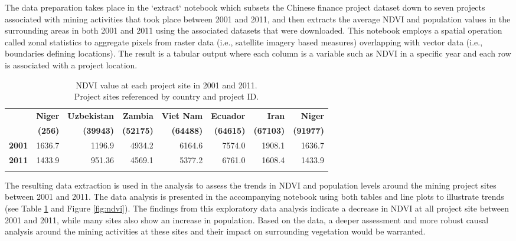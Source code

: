 \documentclass[a4paper]{article}
\begin{document}
The data preparation takes place in the `extract` notebook which subsets the Chinese finance project dataset down to seven projects associated with mining activities that took place between 2001 and 2011, and then extracts the average NDVI and population values in the surrounding areas in both 2001 and 2011 using the associated datasets that were downloaded.  This notebook employs a spatial operation called zonal statistics\citep{Goodman2019} to aggregate pixels from raster data (i.e., satellite imagery based measures) overlapping with vector data (i.e., boundaries defining locations). The result is a tabular output where each column is a variable such as NDVI in a specific year and each row is associated with a project location.


\begin{table}[ht]
\centering
\caption{
    NDVI value at each project site in 2001 and 2011. \\ Project sites referenced by country and project ID.
}
\begin{tabular}{r|rrrrrrr}
\hline
\textbf{} & \textbf{Niger} & \textbf{Uzbekistan} & \textbf{Zambia} & \textbf{Viet Nam} & \textbf{Ecuador} & \textbf{Iran} & \textbf{Niger} \\
\textbf{} & \textbf{(256)} & \textbf{(39943)} & \textbf{(52175)} & \textbf{(64488)} & \textbf{(64615)} & \textbf{(67103)} & \textbf{(91977)} \\
\hline
\textbf{2001} & 1636.7 & 1196.9 & 4934.2 & 6164.6 & 7574.0 & 1908.1 & 1636.7 \\
\textbf{2011} & 1433.9 & 951.36 & 4569.1 & 5377.2 & 6761.0 & 1608.4 & 1433.9 \\
\label{tab:ndvi}
\end{tabular}
\end{table}


The resulting data extraction is used in the analysis to assess the trends in NDVI and population levels around the mining project sites between 2001 and 2011. The data analysis is presented in the accompanying notebook using both tables and line plots to illustrate trends (see Table \ref{tab:ndvi} and Figure \ref{fig:ndvi}). The findings from this exploratory data analysis indicate a decrease in NDVI at all project site between 2001 and 2011, while many sites also show an increase in population. Based on the data, a deeper assessment and more robust causal analysis around the mining activities at these sites and their impact on surrounding vegetation would be warranted.
\end{document}
